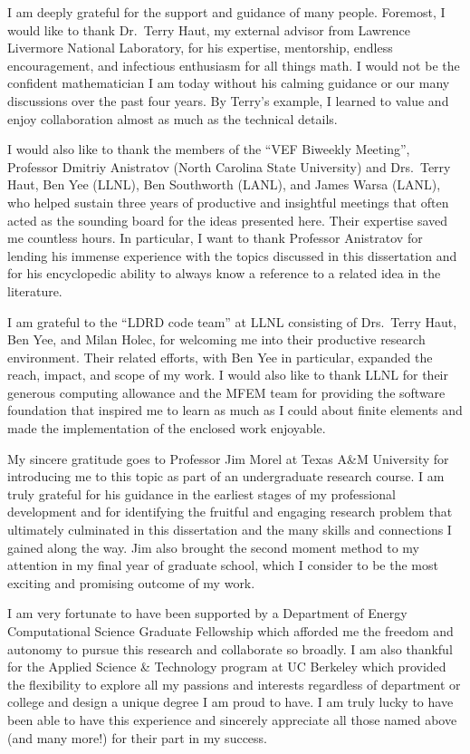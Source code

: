 \documentclass[../doc.tex]{subfiles}
\begin{document}
I am deeply grateful for the support and guidance of many people. 
Foremost, I would like to thank Dr.~Terry Haut, my external advisor from Lawrence Livermore National Laboratory, for his expertise, mentorship, endless encouragement, and infectious enthusiasm for all things math. I would not be the confident mathematician I am today without his calming guidance or our many discussions over the past four years. By Terry's example, I learned to value and enjoy collaboration almost as much as the technical details. 

I would also like to thank the members of the ``VEF Biweekly Meeting'', Professor Dmitriy Anistratov (North Carolina State University) and Drs.~Terry Haut, Ben Yee (LLNL), Ben Southworth (LANL), and James Warsa (LANL), who helped sustain three years of productive and insightful meetings that often acted as the sounding board for the ideas presented here. Their expertise saved me countless hours. In particular, I want to thank Professor Anistratov for lending his immense experience with the topics discussed in this dissertation and for his encyclopedic ability to always know a reference to a related idea in the literature. 

I am grateful to the ``LDRD code team'' at LLNL consisting of Drs.~Terry Haut, Ben Yee, and Milan Holec, for welcoming me into their productive research environment. Their related efforts, with Ben Yee in particular, expanded the reach, impact, and scope of my work. I would also like to thank LLNL for their generous computing allowance and the MFEM team for providing the software foundation that inspired me to learn as much as I could about finite elements and made the implementation of the enclosed work enjoyable.  

My sincere gratitude goes to Professor Jim Morel at Texas A\&M University for introducing me to this topic as part of an undergraduate research course. 
I am truly grateful for his guidance in the earliest stages of my professional development and for identifying the fruitful and engaging research problem that ultimately culminated in this dissertation and the many skills and connections I gained along the way. 
Jim also brought the second moment method to my attention in my final year of graduate school, which I consider to be the most exciting and promising outcome of my work. 

I am very fortunate to have been supported by a Department of Energy Computational Science Graduate Fellowship which afforded me the freedom and autonomy to pursue this research and collaborate so broadly. 
I am also thankful for the Applied Science \& Technology program at UC Berkeley which provided the flexibility to explore all my passions and interests regardless of department or college and design a unique degree I am proud to have. I am truly lucky to have been able to have this experience and sincerely appreciate all those named above (and many more!) for their part in my success. 

\end{document}
